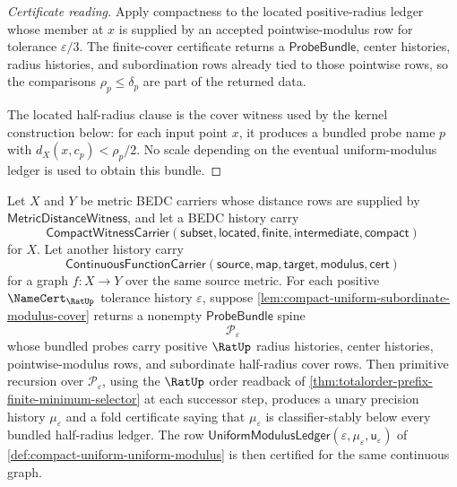 \begin{proof}[Certificate reading]
Apply compactness to the located positive-radius ledger whose member at $x$ is supplied by an accepted pointwise-modulus row for tolerance $\varepsilon/3$. The finite-cover certificate returns a $\mathsf{ProbeBundle}$, center histories, radius histories, and subordination rows already tied to those pointwise rows, so the comparisons $\rho_p \le \delta_p$ are part of the returned data.

The located half-radius clause is the cover witness used by the kernel construction below: for each input point $x$, it produces a bundled probe name $p$ with $d_X(x,c_p)<\rho_p/2$. No scale depending on the eventual uniform-modulus ledger is used to obtain this bundle.
\end{proof}

\begin{theorem}
\label{thm:compact-uniform-finite-minimum-certificate}
Let $X$ and $Y$ be metric BEDC carriers whose distance rows are supplied by $\mathsf{MetricDistanceWitness}$, and let a BEDC history carry
$$
\mathsf{CompactWitnessCarrier}(\mathsf{subset},\mathsf{located},\mathsf{finite},\mathsf{intermediate},\mathsf{compact})
$$
for $X$. Let another history carry
$$
\mathsf{ContinuousFunctionCarrier}(\mathsf{source},\mathsf{map},\mathsf{target},\mathsf{modulus},\mathsf{cert})
$$
for a graph $f \colon X \to Y$ over the same source metric. For each positive $\NameCert_{\RatUp}$ tolerance history $\varepsilon$, suppose \autoref{lem:compact-uniform-subordinate-modulus-cover} returns a nonempty $\mathsf{ProbeBundle}$ spine
$$
\mathcal{P}_\varepsilon
$$
whose bundled probes carry positive $\RatUp$ radius histories, center histories, pointwise-modulus rows, and subordinate half-radius cover rows. Then primitive recursion over $\mathcal{P}_\varepsilon$, using the $\RatUp$ order readback of \autoref{thm:totalorder-prefix-finite-minimum-selector} at each successor step, produces a unary precision history $\mu_\varepsilon$ and a fold certificate saying that $\mu_\varepsilon$ is classifier-stably below every bundled half-radius ledger. The row $\mathsf{UniformModulusLedger}(\varepsilon,\mu_\varepsilon,\mathsf{u}_\varepsilon)$ of \autoref{def:compact-uniform-uniform-modulus} is then certified for the same continuous graph.
\end{theorem}

